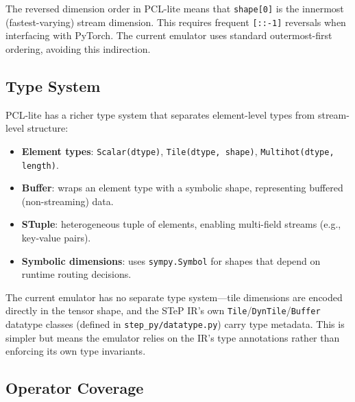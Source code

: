 \documentclass[11pt]{article}
\begin{document}
The reversed dimension order in PCL-lite means that \texttt{shape[0]} is the innermost (fastest-varying) stream dimension.
This requires frequent \texttt{[::-1]} reversals when interfacing with PyTorch.
The current emulator uses standard outermost-first ordering, avoiding this indirection.

\subsection{Type System}

PCL-lite has a richer type system that separates element-level types from stream-level structure:

\begin{itemize}[leftmargin=*]
  \item \textbf{Element types}: \texttt{Scalar(dtype)}, \texttt{Tile(dtype, shape)}, \texttt{Multihot(dtype, length)}.
  \item \textbf{Buffer}: wraps an element type with a symbolic shape, representing buffered (non-streaming) data.
  \item \textbf{STuple}: heterogeneous tuple of elements, enabling multi-field streams (e.g., key-value pairs).
  \item \textbf{Symbolic dimensions}: uses \texttt{sympy.Symbol} for shapes that depend on runtime routing decisions.
\end{itemize}

The current emulator has no separate type system---tile dimensions are encoded directly in the tensor shape, and the STeP IR's own \texttt{Tile}/\texttt{DynTile}/\texttt{Buffer} datatype classes (defined in \texttt{step\_py/datatype.py}) carry type metadata.
This is simpler but means the emulator relies on the IR's type annotations rather than enforcing its own type invariants.

\subsection{Operator Coverage}
\end{document}
